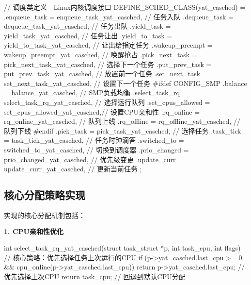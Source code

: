 \begin{tcolorbox}[
    colback=lightblue!5!white,
    colframe=blue!50!black,
    title=\textbf{调度类完整接口定义},
    fonttitle=\bfseries,
    arc=3pt
]
\begin{code}
// 调度类定义 - Linux内核调度接口
DEFINE_SCHED_CLASS(yat_casched) = {
    .enqueue_task       = enqueue_task_yat_casched,    // 任务入队
    .dequeue_task       = dequeue_task_yat_casched,    // 任务出队
    .yield_task         = yield_task_yat_casched,      // 任务让出
    .yield_to_task      = yield_to_task_yat_casched,   // 让出给指定任务
    .wakeup_preempt     = wakeup_preempt_yat_casched,  // 唤醒抢占
    .pick_next_task     = pick_next_task_yat_casched,  // 选择下一个任务
    .put_prev_task      = put_prev_task_yat_casched,   // 放置前一个任务
    .set_next_task      = set_next_task_yat_casched,   // 设置下一个任务
#ifdef CONFIG_SMP
    .balance            = balance_yat_casched,         // SMP负载均衡
    .select_task_rq     = select_task_rq_yat_casched,  // 选择运行队列
    .set_cpus_allowed   = set_cpus_allowed_yat_casched,// 设置CPU亲和性
    .rq_online          = rq_online_yat_casched,       // 队列上线
    .rq_offline         = rq_offline_yat_casched,      // 队列下线
#endif
    .pick_task          = pick_task_yat_casched,       // 选择任务
    .task_tick          = task_tick_yat_casched,       // 任务时钟滴答
    .switched_to        = switched_to_yat_casched,     // 切换到调度器
    .prio_changed       = prio_changed_yat_casched,    // 优先级变更
    .update_curr        = update_curr_yat_casched,     // 更新当前任务
};
\end{code}
\end{tcolorbox}

\subsection{核心分配策略实现}

实现的核心分配机制包括：

\begin{tcolorbox}[
    colback=green!5!white,
    colframe=green!50!black,
    title=\textbf{CPU亲和性优化实现},
    fonttitle=\bfseries,
    arc=3pt
]
\textbf{1. CPU亲和性优化}
\begin{code}
int select_task_rq_yat_casched(struct task_struct *p,
                               int task_cpu, int flags) {
    // 核心策略：优先选择任务上次运行的CPU
    if (p->yat_casched.last_cpu >= 0 && 
        cpu_online(p->yat_casched.last_cpu)) {
        return p->yat_casched.last_cpu;  // 优先选择上次CPU
    }
    return task_cpu;  // 回退到默认CPU分配
}
\end{code}
\end{tcolorbox}

